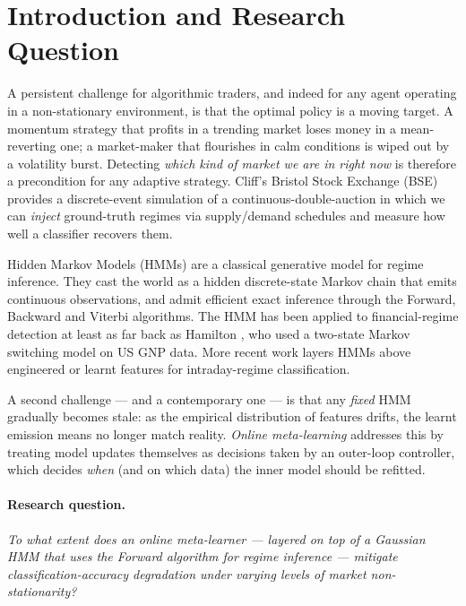 \documentclass[11pt,a4paper]{article}
\begin{document}
\section{Introduction and Research Question}\label{sec:intro}
A persistent challenge for algorithmic traders, and indeed for any agent
operating in a non-stationary environment, is that the optimal policy is a
moving target. A momentum strategy that profits in a trending market loses
money in a mean-reverting one; a market-maker that flourishes in calm
conditions is wiped out by a volatility burst. Detecting \emph{which kind of
market we are in right now} is therefore a precondition for any adaptive
strategy. Cliff's Bristol Stock Exchange (BSE) \cite{cliff2018bse} provides a
discrete-event simulation of a continuous-double-auction in which we can
\emph{inject} ground-truth regimes via supply/demand schedules and measure
how well a classifier recovers them.

Hidden Markov Models (HMMs) \cite{rabiner1989tutorial} are a classical
generative model for regime inference. They cast the world as a hidden
discrete-state Markov chain that emits continuous observations, and admit
efficient exact inference through the Forward, Backward and Viterbi
algorithms. The HMM has been applied to financial-regime detection at least
as far back as Hamilton \cite{hamilton1989new}, who used a two-state Markov
switching model on US GNP data. More recent work
\cite{nguyen2018hmm,zheng2019dlhmm} layers HMMs above engineered or learnt
features for intraday-regime classification.

A second challenge --- and a contemporary one --- is that any \emph{fixed}
HMM gradually becomes stale: as the empirical distribution of features
drifts, the learnt emission means no longer match reality. \emph{Online
meta-learning} \cite{finn2019online} addresses this by treating model updates
themselves as decisions taken by an outer-loop controller, which decides
\emph{when} (and on which data) the inner model should be refitted.

\paragraph{Research question.}
\textit{To what extent does an online meta-learner --- layered on top of a
Gaussian HMM that uses the Forward algorithm for regime inference --- mitigate
classification-accuracy degradation under varying levels of market
non-stationarity?}
\end{document}
